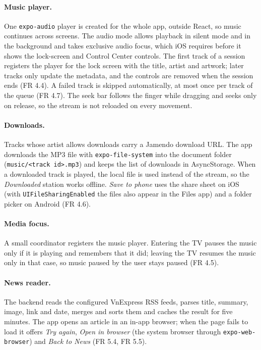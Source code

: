 \paragraph{Music player.}
One \texttt{expo-audio} player is created for the whole app, outside React,
so music continues across screens. The audio mode allows playback in silent
mode and in the background and takes exclusive audio focus, which iOS requires
before it shows the lock-screen and Control Center controls. The first track
of a session registers the player for the lock screen with the title, artist
and artwork; later tracks only update the metadata, and the controls are
removed when the session ends (FR 4.4). A failed track is skipped
automatically, at most once per track of the queue (FR 4.7). The seek bar
follows the finger while dragging and seeks only on release, so the stream is
not reloaded on every movement.

\paragraph{Downloads.}
Tracks whose artist allows downloads carry a Jamendo download URL. The app
downloads the MP3 file with \texttt{expo-file-system} into the document folder
(\texttt{music/<track id>.mp3}) and keeps the list of downloads in AsyncStorage.
When a downloaded track is played, the local file is used instead of the
stream, so the \textit{Downloaded} station works offline. \textit{Save to
phone} uses the share sheet on iOS (with \texttt{UIFileSharingEnabled} the
files also appear in the Files app) and a folder picker on Android (FR 4.6).

\paragraph{Media focus.}
A small coordinator registers the music player. Entering the TV pauses the
music only if it is playing and remembers that it did; leaving the TV resumes
the music only in that case, so music paused by the user stays paused
(FR 4.5).

\paragraph{News reader.}
The backend reads the configured VnExpress RSS feeds, parses title, summary,
image, link and date, merges and sorts them and caches the result for five
minutes. The app opens an article in an in-app browser; when the page fails
to load it offers \textit{Try again}, \textit{Open in browser} (the system
browser through \texttt{expo-web-browser}) and \textit{Back to News}
(FR 5.4, FR 5.5).


